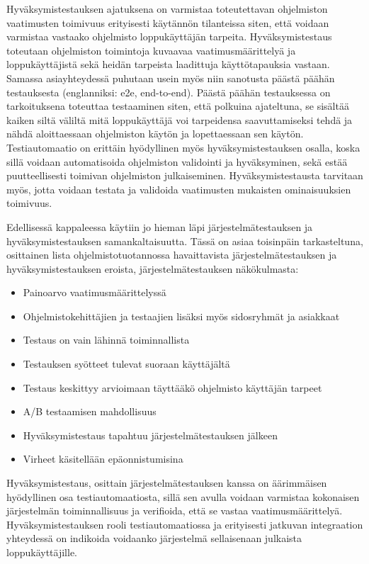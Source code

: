     Hyväksymistestauksen ajatuksena on varmistaa toteutettavan ohjelmiston vaatimusten toimivuus erityisesti käytännön tilanteissa siten, että voidaan varmistaa vastaako ohjelmisto loppukäyttäjän tarpeita.
    Hyväksymistestaus toteutaan ohjelmiston toimintoja kuvaavaa vaatimusmäärittelyä ja loppukäyttäjistä sekä heidän tarpeista laadittuja käyttötapauksia vastaan.
    Samassa asiayhteydessä puhutaan usein myös niin sanotusta päästä päähän testauksesta (englanniksi: e2e, end-to-end).
    Päästä päähän testauksessa on tarkoituksena toteuttaa testaaminen siten, että polkuina ajateltuna, se sisältää kaiken siltä väliltä mitä loppukäyttäjä voi tarpeidensa saavuttamiseksi tehdä ja nähdä aloittaessaan ohjelmiston käytön ja lopettaessaan sen käytön.
    Testiautomaatio on erittäin hyödyllinen myös hyväksymistestauksen osalla, koska sillä voidaan automatisoida ohjelmiston validointi ja hyväksyminen, sekä estää puutteellisesti toimivan ohjelmiston julkaiseminen.
    Hyväksymistestausta tarvitaan myös, jotta voidaan testata ja validoida vaatimusten mukaisten ominaisuuksien toimivuus.

    Edellisessä kappaleessa käytiin jo hieman läpi järjestelmätestauksen ja hyväksymistestauksen samankaltaisuutta.
    Tässä on asiaa toisinpäin tarkasteltuna, osittainen lista ohjelmistotuotannossa havaittavista järjestelmätestauksen ja hyväksymistestauksen eroista, järjestelmätestauksen näkökulmasta:

    \begin{itemize}
      \item Painoarvo vaatimusmäärittelyssä
      \item Ohjelmistokehittäjien ja testaajien lisäksi myös sidosryhmät ja asiakkaat
      \item Testaus on vain lähinnä toiminnallista
      \item Testauksen syötteet tulevat suoraan käyttäjältä
      \item Testaus keskittyy arvioimaan täyttääkö ohjelmisto käyttäjän tarpeet
      \item A/B testaamisen mahdollisuus
      \item Hyväksymistestaus tapahtuu järjestelmätestauksen jälkeen
      \item Virheet käsitellään epäonnistumisina
    \end{itemize}

    Hyväksymistestaus, osittain järjestelmätestauksen kanssa on äärimmäisen hyödyllinen osa testiautomaatiosta, sillä sen avulla voidaan varmistaa kokonaisen järjestelmän toiminnallisuus ja verifioida, että se vastaa vaatimusmäärittelyä.
    Hyväksymistestauksen rooli testiautomaatiossa ja erityisesti jatkuvan integraation yhteydessä on indikoida voidaanko järjestelmä sellaisenaan julkaista loppukäyttäjille.

